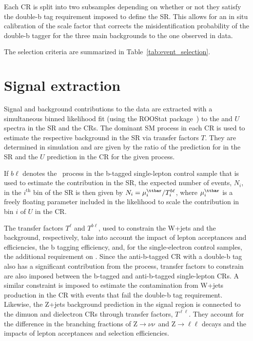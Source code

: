 Each CR is split into two subsamples depending on whether or
not they satisfy the double-b tag requirement imposed to define the SR. This allows for an in situ calibration of the scale factor that corrects the misidentification probability of the double-b tagger for the three main backgrounds to the one observed in data. 

The selection criteria are summarized in Table~\ref{tab:event_selection}.

\section{Signal extraction}

Signal and background contributions to the data are extracted with a simultaneous binned likelihood fit (using the ROOStat package~\cite{roostats}) to the \MET and $U$ spectra in the SR and the CRs.
%
The dominant SM process in each CR is used to estimate the respective background in the SR via transfer factors $T$. They are determined in simulation and are given by the ratio of the prediction for \ptmiss in the SR and the $U$ prediction in the CR for the given process.
  
If $b\ell$ denotes the \ttbar~process in the b-tagged single-lepton control sample that is used to estimate the \ttbar contribution in the SR, the expected number of \ttbar events, $N_{i}$, in the $i^\text{th}$ bin of the SR is then given by $N_{i}= \mu^{\ttbar}_{i}/T^{b\ell}_{i}$, where  $\mu^{\ttbar}_i$ is a freely floating parameter included in the likelihood to scale the \ttbar contribution in bin $i$ of $U$ in the CR.

The transfer factors $T^{\ell}$ and $T^{b\ell}$, used to constrain the W+jets and the \ttbar background, respectively, take into account the impact of lepton acceptances and efficiencies, the b tagging efficiency, and, for the single-electron control samples, the additional requirement on \MET.
Since the anti-b-tagged CR with a double-b tag also has a significant contribution from the \ttbar process,  transfer factors to constrain \ttbar are also imposed between the b-tagged and anti-b-tagged single-lepton CRs.
A similar constraint is imposed to estimate the contamination from W+jets production in the \ttbar CR with events that fail the double-b tag requirement. 
Likewise, the Z+jets background prediction in the signal region is connected to the dimuon and dielectron CRs through transfer factors, $T^{\ell\ell}$.
They account for the difference in the branching fractions of $\mathrm{Z}\rightarrow \nu\nu$~and $\mathrm{Z}\rightarrow \ell\ell$ decays and the impacts of lepton acceptances and selection efficiencies.

